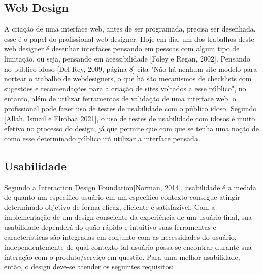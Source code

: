 \documentclass[12pt]{article}
\begin{document}
\subsection{Web Design}

    A criação de uma interface web, antes de ser programada, precisa ser desenhada, esse é o papel do profissional web designer. Hoje em dia, um dos trabalhos deste web designer é desenhar interfaces pensando em pessoas com algum tipo de limitação, ou seja, pensando em acessibilidade [Foley e Regan, 2002]. Pensando no público idoso [Del Rey, 2009, página 8] cita "Não há nenhum site-modelo para nortear o trabalho de webdesigners, o que há são mecanismos de checklists com sugestões e recomendações para a criação de sites voltados a esse público", no entanto, além de utilizar ferramentas de validação de uma interface web, o profissional pode fazer uso de testes de usabilidade com o público idoso. Segundo [Allah, Ismail e Elrobaa 2021], o uso de testes de usabilidade com idosos é muito efetivo no processo do design, já que permite que com que se tenha uma noção de como esse determinado público irá utilizar a interface pensada.

\subsection{Usabilidade}

    Segundo a Interaction Design Foundation[Norman, 2014], usabilidade é a medida de quanto um específico usuário em um específico contexto consegue atingir determinado objetivo de forma eficaz, eficiente e satisfazível. Com a implementação de um design consciente da experiência de um usuário final, sua usabilidade dependerá do quão rápido e intuitivo suas ferramentas e características são integradas em conjunto com as necessidades do usuário, independentemente de qual contexto tal usuário possa se encontrar durante sua interação com o produto/serviço em questão. Para uma melhor usabilidade, então, o design deve-se atender os seguintes requisitos:
\end{document}
